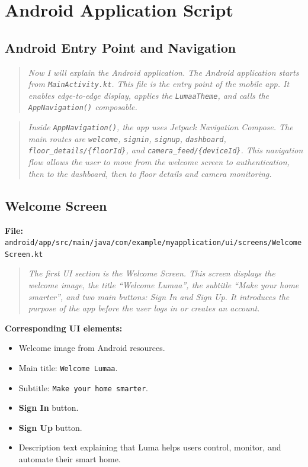 \documentclass[11pt,a4paper]{article}
\begin{document}
\section{Android Application Script}

\subsection{Android Entry Point and Navigation}
\begin{quote}
\textit{Now I will explain the Android application. The Android application starts from \texttt{MainActivity.kt}. This file is the entry point of the mobile app. It enables edge-to-edge display, applies the \texttt{LumaaTheme}, and calls the \texttt{AppNavigation()} composable.}
\end{quote}

\begin{quote}
\textit{Inside \texttt{AppNavigation()}, the app uses Jetpack Navigation Compose. The main routes are \texttt{welcome}, \texttt{signin}, \texttt{signup}, \texttt{dashboard}, \texttt{floor\_details/\{floorId\}}, and \texttt{camera\_feed/\{deviceId\}}. This navigation flow allows the user to move from the welcome screen to authentication, then to the dashboard, then to floor details and camera monitoring.}
\end{quote}

\subsection{Welcome Screen}
\textbf{File:} \texttt{android/app/src/main/java/com/example/myapplication/ui/screens/WelcomeScreen.kt}

\begin{quote}
\textit{The first UI section is the Welcome Screen. This screen displays the welcome image, the title ``Welcome Lumaa'', the subtitle ``Make your home smarter'', and two main buttons: Sign In and Sign Up. It introduces the purpose of the app before the user logs in or creates an account.}
\end{quote}

\textbf{Corresponding UI elements:}
\begin{itemize}
    \item Welcome image from Android resources.
    \item Main title: \texttt{Welcome Lumaa}.
    \item Subtitle: \texttt{Make your home smarter}.
    \item \textbf{Sign In} button.
    \item \textbf{Sign Up} button.
    \item Description text explaining that Luma helps users control, monitor, and automate their smart home.
\end{itemize}
\end{document}

